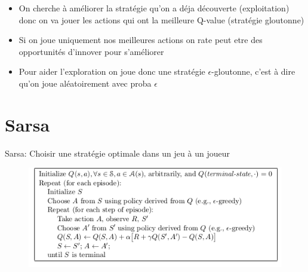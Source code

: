 \documentclass{beamer}	%
\theoremstyle{plain}
\theoremstyle{definition}
\theoremstyle{remark}
\numberwithin{equation}{section}
\begin{document}
\begin{frame}

\begin{itemize}
    \item On cherche à améliorer la stratégie qu'on a déja découverte (exploitation) donc on va jouer les actions qui ont la meilleure Q-value (stratégie gloutonne)
    \item Si on joue uniquement nos meilleures actions on rate peut etre des opportunités d'innover pour s'améliorer
\end{itemize}
\begin{itemize}
    \item Pour aider l'exploration on joue donc une stratégie $\epsilon$-gloutonne, c'est à dire qu'on joue aléatoirement avec proba $\epsilon$
\end{itemize}

\end{frame}


\section{Sarsa}

\begin{frame}

Sarsa: Choisir une stratégie optimale dans un jeu à un joueur

\begin{figure}
\begin{minipage}[t]{1\linewidth}
\centering
\includegraphics[width=0.80 \textwidth,height=0.6\textheight]{photo/sarsa.png}
\label{fig:side:a}
\end{minipage}%

\end{figure}
\end{frame}



\end{document}
